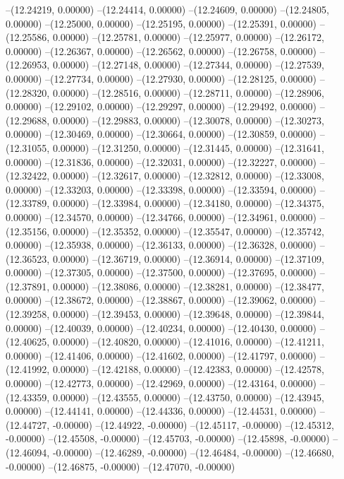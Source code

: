 --(12.24219, 0.00000)
--(12.24414, 0.00000)
--(12.24609, 0.00000)
--(12.24805, 0.00000)
--(12.25000, 0.00000)
--(12.25195, 0.00000)
--(12.25391, 0.00000)
--(12.25586, 0.00000)
--(12.25781, 0.00000)
--(12.25977, 0.00000)
--(12.26172, 0.00000)
--(12.26367, 0.00000)
--(12.26562, 0.00000)
--(12.26758, 0.00000)
--(12.26953, 0.00000)
--(12.27148, 0.00000)
--(12.27344, 0.00000)
--(12.27539, 0.00000)
--(12.27734, 0.00000)
--(12.27930, 0.00000)
--(12.28125, 0.00000)
--(12.28320, 0.00000)
--(12.28516, 0.00000)
--(12.28711, 0.00000)
--(12.28906, 0.00000)
--(12.29102, 0.00000)
--(12.29297, 0.00000)
--(12.29492, 0.00000)
--(12.29688, 0.00000)
--(12.29883, 0.00000)
--(12.30078, 0.00000)
--(12.30273, 0.00000)
--(12.30469, 0.00000)
--(12.30664, 0.00000)
--(12.30859, 0.00000)
--(12.31055, 0.00000)
--(12.31250, 0.00000)
--(12.31445, 0.00000)
--(12.31641, 0.00000)
--(12.31836, 0.00000)
--(12.32031, 0.00000)
--(12.32227, 0.00000)
--(12.32422, 0.00000)
--(12.32617, 0.00000)
--(12.32812, 0.00000)
--(12.33008, 0.00000)
--(12.33203, 0.00000)
--(12.33398, 0.00000)
--(12.33594, 0.00000)
--(12.33789, 0.00000)
--(12.33984, 0.00000)
--(12.34180, 0.00000)
--(12.34375, 0.00000)
--(12.34570, 0.00000)
--(12.34766, 0.00000)
--(12.34961, 0.00000)
--(12.35156, 0.00000)
--(12.35352, 0.00000)
--(12.35547, 0.00000)
--(12.35742, 0.00000)
--(12.35938, 0.00000)
--(12.36133, 0.00000)
--(12.36328, 0.00000)
--(12.36523, 0.00000)
--(12.36719, 0.00000)
--(12.36914, 0.00000)
--(12.37109, 0.00000)
--(12.37305, 0.00000)
--(12.37500, 0.00000)
--(12.37695, 0.00000)
--(12.37891, 0.00000)
--(12.38086, 0.00000)
--(12.38281, 0.00000)
--(12.38477, 0.00000)
--(12.38672, 0.00000)
--(12.38867, 0.00000)
--(12.39062, 0.00000)
--(12.39258, 0.00000)
--(12.39453, 0.00000)
--(12.39648, 0.00000)
--(12.39844, 0.00000)
--(12.40039, 0.00000)
--(12.40234, 0.00000)
--(12.40430, 0.00000)
--(12.40625, 0.00000)
--(12.40820, 0.00000)
--(12.41016, 0.00000)
--(12.41211, 0.00000)
--(12.41406, 0.00000)
--(12.41602, 0.00000)
--(12.41797, 0.00000)
--(12.41992, 0.00000)
--(12.42188, 0.00000)
--(12.42383, 0.00000)
--(12.42578, 0.00000)
--(12.42773, 0.00000)
--(12.42969, 0.00000)
--(12.43164, 0.00000)
--(12.43359, 0.00000)
--(12.43555, 0.00000)
--(12.43750, 0.00000)
--(12.43945, 0.00000)
--(12.44141, 0.00000)
--(12.44336, 0.00000)
--(12.44531, 0.00000)
--(12.44727, -0.00000)
--(12.44922, -0.00000)
--(12.45117, -0.00000)
--(12.45312, -0.00000)
--(12.45508, -0.00000)
--(12.45703, -0.00000)
--(12.45898, -0.00000)
--(12.46094, -0.00000)
--(12.46289, -0.00000)
--(12.46484, -0.00000)
--(12.46680, -0.00000)
--(12.46875, -0.00000)
--(12.47070, -0.00000)

